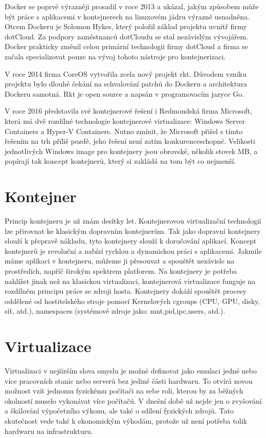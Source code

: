 Docker se poprvé výrazněji prosadil v roce 2013 a ukázal, jakým způsobem může být práce s aplikacemi v kontejnerech na linuxovém jádru výrazně usnadněna. Otcem Dockeru je Solomon Hykes, který položil základ projektu uvnitř firmy dotCloud. Za podpory zaměstnanců dotCloudu se stal nezávislým vývojářem. Docker prakticky změnil celou primární technologii firmy dotCloud a firma se začala specializovat pouze na vývoj tohoto nástroje pro kontejnerizaci.

V roce 2014 firma CoreOS vytvořila zcela nový projekt rkt. Důvodem vzniku projektu bylo dlouhé čekání na schvalování patchů do Dockeru a architektura Dockeru samotná. Rkt je open source a napsán v programovacím jazyce Go.

V roce 2016 představila \cite{windows_container} své kontejnerové řešení i Redmondská firma Microsoft, která má dvě rozdílné technologie kontejnerové virtualizace: Windows Server Containers a Hyper-V Containers. Nutno zmínit, že Microsoft přišel s tímto řešením na trh příliš pozdě, jeho řešení není zatím konkurenceschopné. Velikosti jednotlivých Windows image pro kontejnery jsou obrovské, několik stovek MB, a popírají tak koncept kontejnerů, který si zakládá na tom být co nejmenší.

\section{Kontejner}
Princip kontejneru je už znám desítky let. Kontejnerovou virtualizační technologii lze přirovnat ke klasickým dopravním kontejnerům. Tak jako dopravní kontejnery slouží k přepravě nákladu, tyto kontejnery slouží k doručování aplikací. Koncept kontejnerů je revoluční a nabízí rychlou a dynamickou práci s aplikacemi. Jakmile máme aplikaci v kontejneru, můžeme ji přesouvat a spouštět nezávisle na prostředích, napříč širokým spektrem platforem. Na kontejnery je potřeba nahlížet jinak než na klasickou virtualizaci, kontejnerová virtualizace funguje na rozdílném principu práce se zdroji hosta. Kontejnery dokáží spouštět procesy oddělené od hostitelského stroje pomocí Kernelových cgroups (CPU, GPU, 
disky, síť, atd.), namespaces (systémové zdroje jako: mnt,pid,ipc,users, atd.). 

\section{Virtualizace}
Virtualizaci v nejširším slova smyslu je možné definovat jako emulaci jedné nebo více pracovních stanic nebo serverů bez jediné části hardwaru. To otvírá novou možnost vzít jednomu fyzickému počítači na sebe roli, kterou by za běžných okolností muselo vykonávat více počítačů. V dnešní době už nejde jen o zvyšování a škálování výpočetního výkonu, ale také o sdílení fyzických zdrojů. Tato skutečnost vede také k ekonomickým výhodám, protože už není potřeba tolik hardwaru na infrastrukturu.

